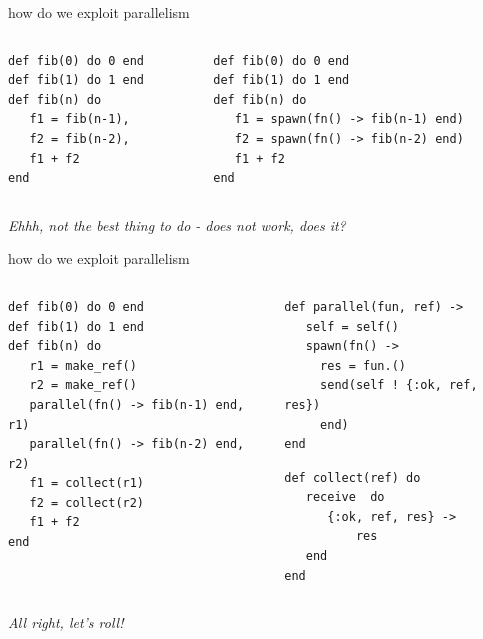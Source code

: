 \begin{frame}[fragile]{how do we exploit parallelism}

\begin{columns}
 \begin{column}{0.5\linewidth}
\begin{verbatim}
def fib(0) do 0 end
def fib(1) do 1 end
def fib(n) do
   f1 = fib(n-1),
   f2 = fib(n-2),
   f1 + f2
end
\end{verbatim}
 \end{column}
\pause
 \begin{column}{0.5\linewidth}
\begin{verbatim}
def fib(0) do 0 end
def fib(1) do 1 end
def fib(n) do
   f1 = spawn(fn() -> fib(n-1) end)
   f2 = spawn(fn() -> fib(n-2) end)
   f1 + f2
end
\end{verbatim}
 \end{column}
\end{columns}

\pause\vspace{20pt}
{\em Ehhh, not the best thing to do - does not work, does it?}

\end{frame}


\begin{frame}[fragile]{how do we exploit parallelism}

\begin{columns}
 \begin{column}{0.6\linewidth}
 \begin{verbatim}
def fib(0) do 0 end
def fib(1) do 1 end
def fib(n) do
   r1 = make_ref()
   r2 = make_ref()
   parallel(fn() -> fib(n-1) end, r1)
   parallel(fn() -> fib(n-2) end, r2)
   f1 = collect(r1)
   f2 = collect(r2)
   f1 + f2
end
\end{verbatim}
 \end{column}
\pause
 \begin{column}{0.4\linewidth}
\begin{verbatim}
def parallel(fun, ref) ->
   self = self()
   spawn(fn() -> 
     res = fun.()
     send(self ! {:ok, ref, res})
     end)
end 
\end{verbatim}
\begin{verbatim}
def collect(ref) do
   receive  do
      {:ok, ref, res} ->
          res
   end
end
\end{verbatim}
 \end{column}
\end{columns}

\pause\vspace{20pt}
{\em All right, let's roll!}

\end{frame}

